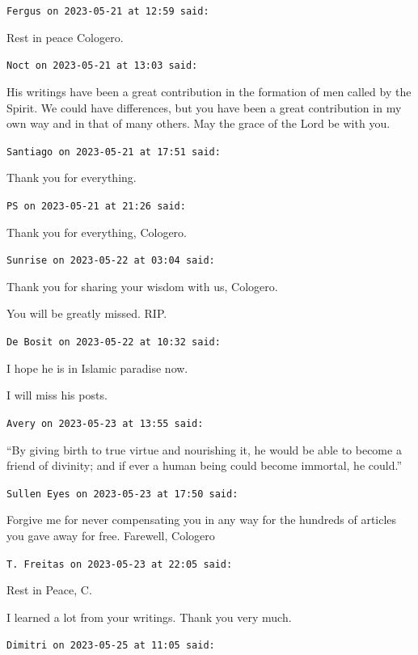 \begin{footnotesize}
\begin{sffamily}
\hfill

\texttt{Fergus on 2023-05-21 at 12:59 said:}

Rest in peace Cologero.

\hfill

\texttt{Noct on 2023-05-21 at 13:03 said:}

His writings have been a great contribution in the formation of men called by the Spirit. We could have differences, but you have been a great contribution in my own way and in that of many others. May the grace of the Lord be with you.

\hfill

\texttt{Santiago on 2023-05-21 at 17:51 said:}

Thank you for everything.

\hfill

\texttt{PS on 2023-05-21 at 21:26 said:}

Thank you for everything, Cologero.

\hfill

\texttt{Sunrise on 2023-05-22 at 03:04 said:}

Thank you for sharing your wisdom with us, Cologero.

You will be greatly missed. RIP.

\hfill

\texttt{De Bosit on 2023-05-22 at 10:32 said:}

I hope he is in Islamic paradise now.

I will miss his posts.

\hfill

\texttt{Avery on 2023-05-23 at 13:55 said:}

``By giving birth to true virtue and nourishing it, he would be able to become a friend of divinity; and if ever a human being could become immortal, he could.''

\hfill

\texttt{Sullen Eyes on 2023-05-23 at 17:50 said:}

Forgive me for never compensating you in any way for the hundreds of articles you gave away for free. Farewell, Cologero

\hfill

\texttt{T. Freitas on 2023-05-23 at 22:05 said:}

Rest in Peace, C.

I learned a lot from your writings. Thank you very much.

\hfill

\texttt{Dimitri on 2023-05-25 at 11:05 said:}


\end{sffamily}
\end{footnotesize}
